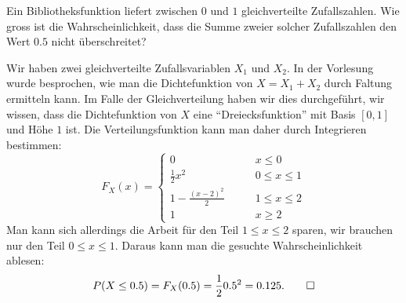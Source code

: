 Ein Bibliotheksfunktion liefert zwischen $0$ und $1$ gleichverteilte
Zufallszahlen. Wie gross ist die Wahrscheinlichkeit, dass die Summe
zweier solcher Zufallszahlen den Wert $0.5$ nicht überschreitet?


\begin{loesung}
Wir haben zwei gleichverteilte Zufallsvariablen $X_1$ und $X_2$. 
In der Vorlesung wurde besprochen, wie man die Dichtefunktion
von $X=X_1+X_2$ durch Faltung ermitteln kann.
Im Falle der Gleichverteilung haben wir dies durchgeführt,
wir wissen, dass die Dichtefunktion von $X$
eine ``Dreiecksfunktion'' mit Basis $[0,1]$ und Höhe $1$ ist.
Die Verteilungsfunktion kann man daher durch Integrieren bestimmen:
\[
F_X(x)=\begin{cases}
0&\qquad x\le 0\\
\frac12x^2&\qquad 0\le x\le 1\\
1-\frac{(x-2)^2}2&\qquad1\le x\le 2\\
1&\qquad x\ge 2
\end{cases}
\]
Man kann sich allerdings die Arbeit für den Teil $1\le x\le 2$ sparen,
wir brauchen nur den Teil $0\le x\le 1$.
Daraus kann man die gesuchte Wahrscheinlichkeit ablesen:
\[
P(X\le 0.5)=F_X(0.5)=\frac120.5^2=0.125.
\qedhere
\]
\end{loesung}

